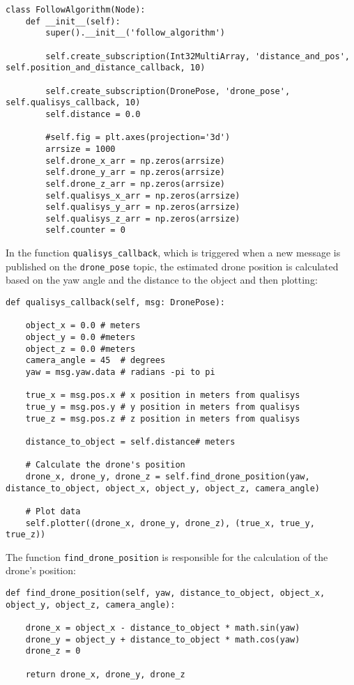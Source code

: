 \begin{lstlisting}[language=PythonPlus]
class FollowAlgorithm(Node):
    def __init__(self): 
        super().__init__('follow_algorithm') 

        self.create_subscription(Int32MultiArray, 'distance_and_pos', self.position_and_distance_callback, 10)
        
        self.create_subscription(DronePose, 'drone_pose', self.qualisys_callback, 10)
        self.distance = 0.0

        #self.fig = plt.axes(projection='3d')
        arrsize = 1000
        self.drone_x_arr = np.zeros(arrsize)
        self.drone_y_arr = np.zeros(arrsize)
        self.drone_z_arr = np.zeros(arrsize)
        self.qualisys_x_arr = np.zeros(arrsize)
        self.qualisys_y_arr = np.zeros(arrsize)
        self.qualisys_z_arr = np.zeros(arrsize)
        self.counter = 0
\end{lstlisting}

In the function \verb|qualisys_callback|, which is triggered when a new message is published on the \verb|drone_pose| topic, the estimated drone position is calculated based on the yaw angle and the distance to the object and then plotting:

\begin{lstlisting}[language=PythonPlus]
def qualisys_callback(self, msg: DronePose):

    object_x = 0.0 # meters
    object_y = 0.0 #meters 
    object_z = 0.0 #meters
    camera_angle = 45  # degrees
    yaw = msg.yaw.data # radians -pi to pi

    true_x = msg.pos.x # x position in meters from qualisys
    true_y = msg.pos.y # y position in meters from qualisys
    true_z = msg.pos.z # z position in meters from qualisys
    
    distance_to_object = self.distance# meters

    # Calculate the drone's position
    drone_x, drone_y, drone_z = self.find_drone_position(yaw, distance_to_object, object_x, object_y, object_z, camera_angle)

    # Plot data
    self.plotter((drone_x, drone_y, drone_z), (true_x, true_y, true_z))
\end{lstlisting}

The function \verb|find_drone_position| is responsible for the calculation of the drone's position:

\begin{lstlisting}[language=PythonPlus]
def find_drone_position(self, yaw, distance_to_object, object_x, object_y, object_z, camera_angle):

    drone_x = object_x - distance_to_object * math.sin(yaw)
    drone_y = object_y + distance_to_object * math.cos(yaw)
    drone_z = 0

    return drone_x, drone_y, drone_z
\end{lstlisting}

